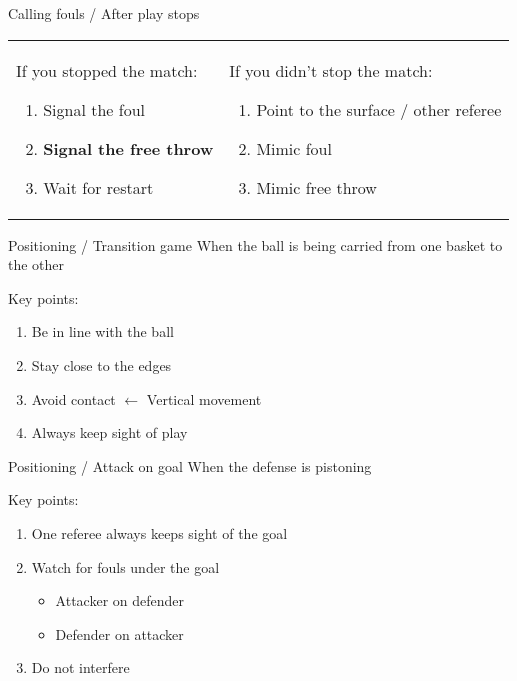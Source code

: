 \begin{frame}{Calling fouls / After play stops}
    \begin{tabular}{ll}
        \parbox{0.5\linewidth} { If you stopped the match:
            \begin{enumerate}
                \item Signal the foul
                \item \textbf{Signal the free throw}
                \item Wait for restart
            \end{enumerate}

            \pause{}
        }
         &
        \parbox{0.5\linewidth} { If you didn't stop the match:
            \begin{enumerate}
                \item Point to the surface / other referee
                \item Mimic foul
                \item Mimic free throw
            \end{enumerate}
        }
    \end{tabular}
\end{frame}

\begin{frame}{Positioning / Transition game}
    When the ball is being carried from one basket to the other

    \pause{}

    \vspace{0.75cm}

    Key points:

    \begin{enumerate}
        \item Be in line with the ball
        \item Stay close to the edges
        \item Avoid contact $\leftarrow$ Vertical movement
        \item Always keep sight of play
    \end{enumerate}
\end{frame}

\begin{frame}{Positioning / Attack on goal}
    When the defense is pistoning

    \pause{}

    \vspace{0.75cm}

    Key points:

    \begin{enumerate}
        \item One referee always keeps sight of the goal
        \item Watch for fouls under the goal
              \begin{itemize}
                  \item Attacker on defender
                  \item Defender on attacker
              \end{itemize}
        \item Do not interfere
    \end{enumerate}
\end{frame}

